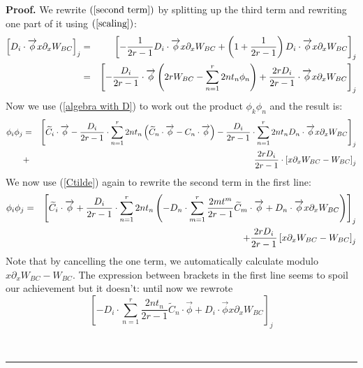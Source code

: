 \documentclass[a4paper,11pt]{article}
\newenvironment{proof}[1][Proof]{\textbf{#1.} }{\ \rule{0.5em}{0.5em}}
\numberwithin{equation}{section}
\begin{document}
\begin{proof}
\qquad  \newline
\noindent
We rewrite $\left( \ref{second term}\right) $ by splitting up the third term
and rewriting one part of it using $\left( \ref{scaling}\right) $: 
\begin{eqnarray}
\left[ D_{i}\cdot \overrightarrow{\phi }x\partial _{x}W_{BC}\right] _{j} &=&%
\left[ -\frac{1}{2r-1}D_{i}\cdot \overrightarrow{\phi }x\partial
_{x}W_{BC}+\left( 1+\frac{1}{2r-1}\right) D_{i}\cdot \overrightarrow{\phi }%
x\partial _{x}W_{BC}\right] _{j}  \notag \\
&=&\left[ -\frac{D_{i}}{2r-1}\cdot \overrightarrow{\phi }\left(
2rW_{BC}-\sum_{n=1}^{r}2nt_{n}\phi _{n}\right) +\frac{2rD_{i}}{2r-1}\cdot 
\overrightarrow{\phi }x\partial _{x}W_{BC}\right] _{j}
\end{eqnarray}
Now we use (\ref{algebra with D}) to work out the product $\phi _{k}\phi _{n}
$ and the result is: 
\begin{eqnarray}
\phi _{i}\phi _{j}&=&\left[ \widetilde{C}_{i}\cdot \overrightarrow{\phi }-%
\frac{D_{i}}{2r-1}\cdot \sum_{n=1}^{r}2nt_{n}\left( \widetilde{C}_{n}\cdot 
\overrightarrow{\phi }-C_{n}\cdot \overrightarrow{\phi }\right) -\frac{D_{i}%
}{2r-1}\cdot \sum_{n=1}^{r}2nt_{n}D_{n}\cdot \overrightarrow{\phi }x\partial
_{x}W_{BC}\right] _{j} \notag \\
&+& \frac{2rD_{i}}{2r-1}\cdot \left[ x\partial _{x}W_{BC}-W_{BC}\right] _{j} 
\end{eqnarray}
We now use (\ref{Ctilde}) again to rewrite the second term in the first
line: 
\begin{eqnarray}
\phi _{i}\phi _{j} &=&\left[ \widetilde{C}_{i}\cdot \overrightarrow{\phi }+%
\frac{D_{i}}{2r-1}\cdot \sum_{n=1}^{r}2nt_{n}\left( -D_{n}\cdot
\sum_{m=1}^{r}\frac{2mt^{m}}{2r-1}\widetilde{C}_{m}\cdot \overrightarrow{%
\phi }+D_{n}\cdot \overrightarrow{\phi }x\partial _{x}W_{BC}\right) \right]
_{j}  \notag  \\
&&+\frac{2rD_{i}}{2r-1}\left[ x\partial _{x}W_{BC}-W_{BC}\right] _{j}
\end{eqnarray}
Note that by cancelling the one term, we automatically calculate modulo $%
x\partial _{x}W_{BC}-W_{BC}$. The expression between brackets in the first line seems to
spoil our achievement but it doesn't: until now we rewrote 
\begin{equation}
\left[ -D_{i}\cdot \sum_{n=1}^{r}\frac{2nt_{n}}{2r-1}\widetilde{C}_{n}\cdot 
\overrightarrow{\phi }+D_{i}\cdot \overrightarrow{\phi }x\partial _{x}W_{BC}%
\right] _{j}
\end{equation}

\end{proof}
\end{document}
